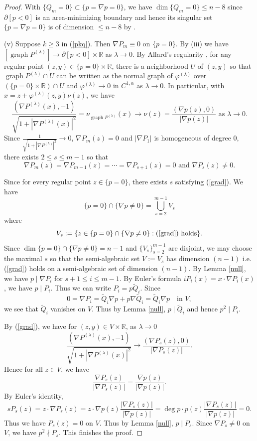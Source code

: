 \documentclass[pdflatex,sn-mathphys-num]{sn-jnl}%
\theoremstyle{thmstyleone}%
\theoremstyle{thmstyletwo}%
\theoremstyle{thmstylethree}%
\newcommand{\vp}{\varphi}
\newcommand{\R}{\mathbb{R}}
\DeclareMathOperator{\graph}{graph}
\begin{document}
\begin{proof}
	With $\{Q_m=0\}\subset \{p=\nabla p=0\}$, we have $\dim\{Q_m=0\}\le n-8$ since $\partial [p<0]$ is an area-minimizing boundary and hence its singular set $\{p=\nabla p=0\}$ is of dimension $\le n-8$ by \cite{Fed70}.
	
	(v)
	Suppose $k\ge 3$ in (\ref{pkq}). Then $\nabla P_m\equiv0$ on $\{p =0\}$.  By (iii) we have $[\graph P^{(\lambda)}]\to \partial [p <0]\times \R$ as $\lambda\to 0$. By Allard's regularity \cite[Theorem 24.2]{Sim}, for any regular point $(z,y)\in \{p =0\}\times \R$, there is a neighborhood $U$ of $(z,y)$ so that $\graph P^{(\lambda)}\cap U$ can be written as the normal graph of $\vp^{(\lambda)}$ over $(\{p =0\}\times\R)\cap U$ and $\vp^{(\lambda)}\to0$ in $C^{1,\alpha}$ as $\lambda\to0$. In particular, with $x=z+\vp^{(\lambda)}(z,y)\nu(z)$, we have
	\[
	\frac{(\nabla P^{(\lambda)}(x),-1)}{\sqrt{1+|\nabla P^{(\lambda)}(x)|^2}}=\nu_{\graph P^{(\lambda)}}(x)\to \nu(z)=\frac{(\nabla p (z),0)}{|\nabla p (z)|}\text{ as }  \lambda\to 0.
	\]
	Since $\frac{1}{\sqrt{1+|\nabla P^{(\lambda)}|^2}}\to 0$, $\nabla P_m(z)=0$ and $|\nabla P_1|$ is homogeneous of degree 0, there exists $2\le s\le m-1$ so that 
	\begin{equation}\label{grad}
		\nabla P_m(z)=\nabla P_{m-1}(z)=\cdots=\nabla P_{s+1}(z)=0\text{ and }\nabla P_s(z)\neq 0.
	\end{equation} 
	
	Since for every regular point $z\in \{p =0\}$, there exists $s$ satisfying (\ref {grad}). We have
	\[\{p=0\}\cap \{\nabla p\neq0\}=\bigcup_{s=2}^{m-1}V_s\] where \[V_s:=\{z\in \{p=0\}\cap \{\nabla p\neq0\}:\text{(\ref{grad}) holds}\}.\] Since $\dim \{p=0\}\cap\{\nabla p\neq0\}=n-1$ and $\{V_s\}_{s=2}^{m-1}$ are disjoint, we may choose the maximal $s$ so that the semi-algebraic set $V:=V_s$ has dimension $(n-1)$ i.e. (\ref{grad}) holds on a semi-algebraic set of dimension $(n-1)$. By Lemma \ref{null}, we have $p \mid \nabla P_i$ for $s+1\le i\le m-1$. By Euler's formula $iP_i(x)=x\cdot\nabla P_i(x)$, we have $p \mid P_i$. Thus we can write $P_i=p \tilde Q_i$. Since \[0=\nabla P_i=\tilde Q_i\nabla p  +p \nabla \tilde Q_i=\tilde Q_i\nabla p \quad \text{in }V,\]we see that $\tilde Q_i$ vanishes on $V$. Thus by Lemma \ref{null}, $p \mid \tilde Q_i$ and hence $p ^2\mid P_i$.
	
	By  (\ref{grad}), we have for $(z,y)\in V\times \R$, as $\lambda\to0$ 
	\[\frac{(\nabla P^{(\lambda)}(x),-1)}{\sqrt{1+|\nabla P^{(\lambda)}(x)|^2}}\to \frac{(\nabla P_s(z),0)}{|\nabla P_s(z)|}.\]
	Hence for all $z\in V$, we have
	\[\frac{\nabla P_s(z)}{|\nabla P_s(z)|}=\frac{\nabla p (z)}{|\nabla p (z)|}.\]
	By Euler's identity, \[sP_s(z)=z\cdot \nabla P_s(z)=z\cdot \nabla p (z)\frac{|\nabla P_s(z)|}{|\nabla p (z)|}=\deg p \cdot p (z)\frac{|\nabla P_s(z)|}{|\nabla p (z)|}=0.\] Thus we have $P_s(z)=0$ on $V$. Thus by Lemma \ref{null}, $p \mid P_s$. Since $\nabla P_s\neq0$ on $V$, we have $p^2\nmid P_s$. This finishes the proof.
\end{proof}
\end{document}
